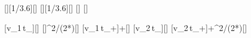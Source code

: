[\kmph][1/3.6][\mps]
[\kmph][1/3.6][\mps]
[\s]
[\mpss]

[v_1\,t_]{\vAaX*\tReX}[\m]
[]{\vAaX^2/(2*\aBrX)}[\m]
[v_1\,t_+]{\sRaX+\sBaX}[\m]
[v_2\,t_]{\vAbX*\tReX}[\m]
[v_2\,t_+]{\sRbX+\vAbX^2/(2*\aBrX)}[\m]
